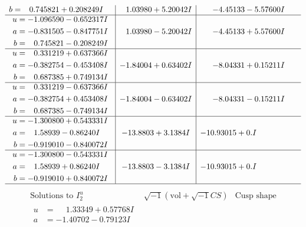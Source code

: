 \documentclass[1p]{elsarticle_modified}
\theoremstyle{definition}
\newcommand{\I}{\sqrt{-1}}
\begin{document}
$$\begin{array}{c|c|c}
\begin{aligned}
b &= \phantom{-}0.745821 + 0.208249 I\end{aligned}
 & \phantom{-}1.03980 + 5.20042 I & -4.45133 - 5.57600 I \\ \hline\begin{aligned}
u &= -1.096590 - 0.652317 I \\
a &= -0.831505 - 0.847751 I \\
b &= \phantom{-}0.745821 - 0.208249 I\end{aligned}
 & \phantom{-}1.03980 - 5.20042 I & -4.45133 + 5.57600 I \\ \hline\begin{aligned}
u &= \phantom{-}0.331219 + 0.637366 I \\
a &= -0.382754 - 0.453408 I \\
b &= \phantom{-}0.687385 + 0.749134 I\end{aligned}
 & -1.84004 + 0.63402 I & -8.04331 + 0.15211 I \\ \hline\begin{aligned}
u &= \phantom{-}0.331219 - 0.637366 I \\
a &= -0.382754 + 0.453408 I \\
b &= \phantom{-}0.687385 - 0.749134 I\end{aligned}
 & -1.84004 - 0.63402 I & -8.04331 - 0.15211 I \\ \hline\begin{aligned}
u &= -1.300800 + 0.543331 I \\
a &= \phantom{-}1.58939 - 0.86240 I \\
b &= -0.919010 - 0.840072 I\end{aligned}
 & -13.8803 + 3.1384 I & -10.93015 + 0. I\phantom{ +0.000000I} \\ \hline\begin{aligned}
u &= -1.300800 - 0.543331 I \\
a &= \phantom{-}1.58939 + 0.86240 I \\
b &= -0.919010 + 0.840072 I\end{aligned}
 & -13.8803 - 3.1384 I & -10.93015 + 0. I\phantom{ +0.000000I}\\
 \hline 
 \end{array}$$\newpage$$\begin{array}{c|c|c}  
\text{Solutions to }I^u_{2}& \I (\text{vol} + \sqrt{-1}CS) & \text{Cusp shape}\\
 \hline 
\begin{aligned}
u &= \phantom{-}1.33349 + 0.57768 I \\
a &= -1.40702 - 0.79123 I \\

\end{aligned}
\end{array}$$
\end{document}
